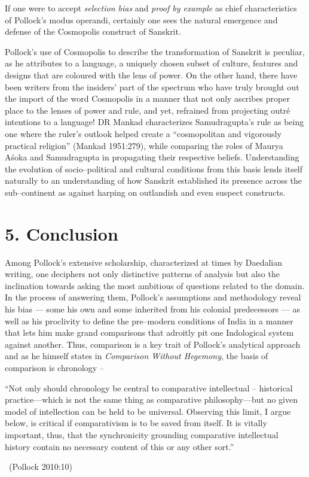 If one were to accept \textit{selection bias} and \textit{proof by example} as chief characteristics of Pollock’s modus operandi, certainly one sees the natural emergence and defense of the Cosmopolis construct of Sanskrit.

Pollock’s use of Cosmopolis to describe the transformation of Sanskrit is peculiar, as he attributes to a language, a uniquely chosen subset of culture, features and designs that are coloured with the lens of power. On the other hand, there have been writers from the insiders’ part of the spectrum who have truly brought out the import of the word Cosmopolis in a manner that not only ascribes proper place to the lenses of power and rule, and yet, refrained from projecting outré intentions to a language! DR Mankad characterizes Samudragupta’s rule as being one where the ruler’s outlook helped create a “cosmopolitan and vigorously practical religion” (Mankad 1951:279), while comparing the roles of Maurya Aśoka and Samudragupta in propagating their respective beliefs. Understanding the evolution of socio–political and cultural conditions from this basis lends itself naturally to an understanding of how Sanskrit established its presence across the sub–continent as against harping on outlandish and even suspect constructs.



\section*{5. Conclusion}

Among Pollock’s extensive scholarship, characterized at times by Daedalian writing, one deciphers not only distinctive patterns of analysis but also the inclination towards asking the most ambitious of questions related to the domain. In the process of answering them, Pollock’s assumptions and methodology reveal his bias — some his own and some inherited from his colonial predecessors — as well as his proclivity to define the pre–modern conditions of India in a manner that lets him make grand comparisons that adroitly pit one Indological system against another. Thus, comparison is a key trait of Pollock’s analytical approach and as he himself states in \textit{Comparison Without Hegemony}, the basis of comparison is chronology –

\begin{myquote}
“Not only should chronology be central to comparative intellectual – historical practice—which is not the same thing as comparative philosophy—but no given model of intellection can be held to be universal. Observing this limit, I argue below, is critical if comparativism is to be saved from itself. It is vitally important, thus, that the synchronicity grounding comparative intellectual history contain no necessary content of this or any other sort.” 

~\hfill (Pollock 2010:10)
\end{myquote}

